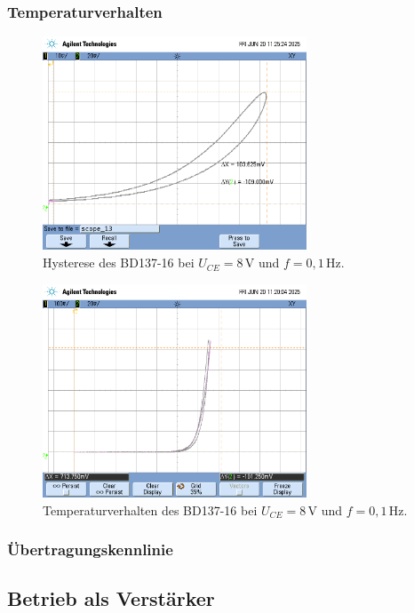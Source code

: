 \documentclass[
	a4paper, %
	12pt, %
]{CSUniSchoolLabReport}
\begin{document}
\subsubsection{Temperaturverhalten}
\begin{figure}[H]
	\centering
	\includegraphics[width=0.7\textwidth]{Figures/TemperaturHysterese8V0.1hznah.png}
	\caption{Hysterese des BD137-16 bei $U_{CE} = 8\,\mathrm{V}$ und $f = 0{,}1\,\mathrm{Hz}$.}
	\label{fig:8VTemperaturHysterese0.1hznah}
\end{figure}\begin{figure}[H]
	\centering
	\includegraphics[width=0.7\textwidth]{Figures/8V1khz0.1hzzusammentemp.png}
	\caption{Temperaturverhalten des BD137-16 bei $U_{CE} = 8\,\mathrm{V}$ und $f = 0{,}1\,\mathrm{Hz}$.}
	\label{fig:8V1khz0.1hzzusammentemp}
\end{figure}

\subsubsection{Übertragungskennlinie}
\subsection{Betrieb als Verstärker}
\end{document}
